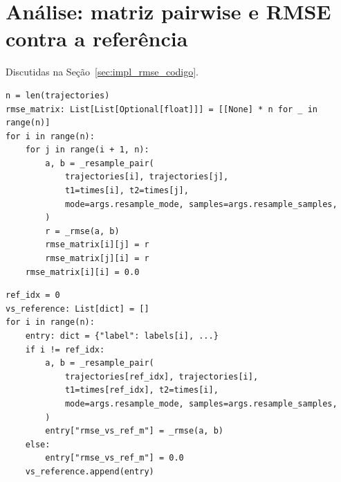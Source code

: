 \section{Análise: matriz pairwise e RMSE contra a referência}

Discutidas na Seção~\ref{sec:impl_rmse_codigo}.

\begin{lstlisting}[style=pycode, caption={Laço pairwise que produz a matriz $N\times N$ de RMSE (\texttt{scripts/\allowbreak analyze\_\allowbreak runs.py}, função \texttt{main}).}, label={lst:rmse_pairwise}]
n = len(trajectories)
rmse_matrix: List[List[Optional[float]]] = [[None] * n for _ in range(n)]
for i in range(n):
    for j in range(i + 1, n):
        a, b = _resample_pair(
            trajectories[i], trajectories[j],
            t1=times[i], t2=times[j],
            mode=args.resample_mode, samples=args.resample_samples,
        )
        r = _rmse(a, b)
        rmse_matrix[i][j] = r
        rmse_matrix[j][i] = r
    rmse_matrix[i][i] = 0.0
\end{lstlisting}

\begin{lstlisting}[style=pycode, caption={RMSE de cada execução contra a execução de referência (\texttt{fleet\_ws/\allowbreak scripts/\allowbreak analyze\_runs.py}).}, label={lst:rmse_mean}]
ref_idx = 0
vs_reference: List[dict] = []
for i in range(n):
    entry: dict = {"label": labels[i], ...}
    if i != ref_idx:
        a, b = _resample_pair(
            trajectories[ref_idx], trajectories[i],
            t1=times[ref_idx], t2=times[i],
            mode=args.resample_mode, samples=args.resample_samples,
        )
        entry["rmse_vs_ref_m"] = _rmse(a, b)
    else:
        entry["rmse_vs_ref_m"] = 0.0
    vs_reference.append(entry)
\end{lstlisting}

